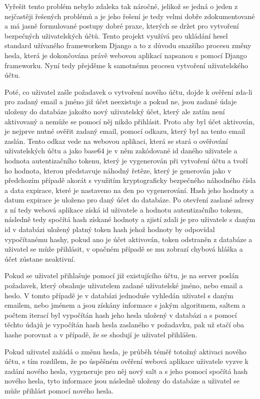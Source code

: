 \documentclass[12pt]{article}
\begin{document}
Vyřešit tento problém nebylo zdaleka tak náročné, jelikož se jedná o jeden z nejčastěji řešených problémů a je jeho řešení je tedy velmi dobře zdokumentované a má jasně formulované postupy dobré praxe, kterých se držet pro vytvoření bezpečných uživatelských účtů. Tento projekt využívá pro ukládání hesel standard užívaného frameworkem Django a to z důvodu snazšího procesu změny hesla, která je dokončována právě webovou aplikací napsanou s pomocí Django frameworku. Nyní tedy přejděme k samotnému procesu vytvoření uživatelského účtu.

Poté, co uživatel zašle požadavek o vytvoření nového účtu, dojde k ověření zda-li pro zadaný email a jméno již účet neexistuje a pokud ne, jsou zadané údaje uloženy do databáze jakožto nový uživatelský účet, který ale zatím není aktivovaný a nemůže se pomocí něj nikdo přihlásit. Proto aby byl účet aktivován, je nejprve nutné ověřit zadaný email, pomocí odkazu, který byl na tento email zaslán. Tento odkaz vede na webovou aplikaci, která se stará o ověřování uživatelských účtu a jako base64 je v něm zakódované id daného uživatele a hodnota autentizačního tokenu, který je vygenerován při vytvoření účtu a tvoří ho hodnota, kterou představuje náhodný řetěze, který je generován jako v předchozím případě akorát s využitím kryptograficky bezpečného náhodného čísla a data expirace, které je nastaveno na den po vygenerování. Hash jeho hodnoty a datum expirace je uloženo pro daný účet do databáze. Po otevření zaslané adresy z ní tedy webová aplikace získá id uživatele a hodnotu autentizačního tokenu, následně tedy spočítá hash získané hodnoty a zjistí zdali je pro uživatele s daným id v databázi uložený platný token hash jehož hodnoty by odpovídal vypočítanému hashy, pokud ano je účet aktivován, token odstraněn z databáze a uživatel se může přihlásit, v opačném případě se mu zobrazí chybová hláška a účet zůstane neaktivní.

Pokud se uživatel přihlašuje pomocí již existujícího účtu, je na server poslán požadavek, který obsahuje uživatelem zadané uživatelské jméno, nebo email a heslo. V tomto případě je v databázi jednoduše vyhledán uživatel s daným emailem, nebo jménem a jsou získány informace s jakým algoritmem, saltem a počtem iterací byl vypočítán hash jeho hesla uložený v databázi a s pomocí těchto údajů je vypočítán hash hesla zaslaného v požadavku, pak už stačí oba hashe porovnat a v případě, že se shodují je uživatel přihlášen.

Pokud uživatel zažádá o změnu hesla, je průběh téměř totožný aktivaci nového účtu, s tím rozdílem, že po úspěšném ověření webová aplikace uživatele vyzve k zadání nového hesla, vygeneruje pro něj nový salt a s jeho pomocí spočítá hash nového hesla, tyto informace jsou následně uloženy do databáze a uživatel se může přihlást pomocí nového hesla. 
\end{document}

